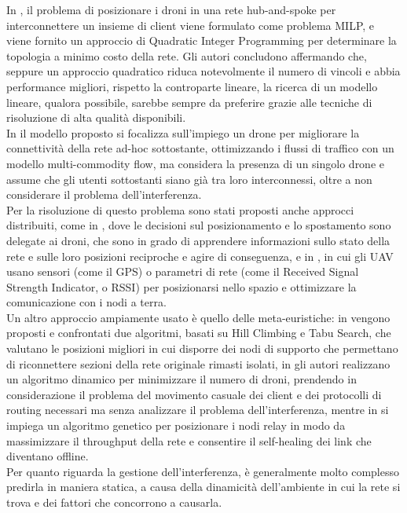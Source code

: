 In \cite{6564778}, il problema di posizionare i droni in una rete hub-and-spoke per interconnettere un insieme di client viene formulato come problema MILP, e viene fornito un approccio di Quadratic Integer Programming per determinare la topologia a minimo costo della rete.
Gli autori concludono affermando che, seppure un approccio quadratico riduca notevolmente il numero di vincoli e abbia performance migliori, rispetto la controparte lineare, la ricerca di un modello lineare, qualora possibile, sarebbe sempre da preferire grazie alle tecniche di risoluzione di alta qualità disponibili.\\
In \cite{4455114} il modello proposto si focalizza sull'impiego un drone per migliorare la connettività della rete ad-hoc sottostante, ottimizzando i flussi di traffico con un modello multi-commodity flow, ma considera la presenza di un singolo drone e assume che gli utenti sottostanti siano già tra loro interconnessi, oltre a non considerare il problema dell'interferenza. \\
Per la risoluzione di questo problema sono stati proposti anche approcci distribuiti, come in \cite{Correll09ad-hocwireless}, dove le decisioni sul posizionamento e lo spostamento sono delegate ai droni, che sono in grado di apprendere informazioni sullo stato della rete e sulle loro posizioni reciproche e agire di conseguenza, e in \cite{6162393}, in cui gli UAV usano sensori (come il GPS) o parametri di rete (come il Received Signal Strength Indicator, o RSSI) per posizionarsi nello spazio e ottimizzare la comunicazione con i nodi a terra. \\
Un altro approccio ampiamente usato è quello delle meta-euristiche: in \cite{5983050} vengono proposti e confrontati due algoritmi, basati su Hill Climbing e Tabu Search, che valutano le posizioni migliori in cui disporre dei nodi di supporto che permettano di riconnettere sezioni della rete originale rimasti isolati, in \cite{1495151} gli autori realizzano un algoritmo dinamico per minimizzare il numero di droni, prendendo in considerazione il problema del movimento casuale dei client e dei protocolli di routing necessari ma senza analizzare il problema dell'interferenza, mentre in \cite{Rohde20131893} si impiega un algoritmo genetico per posizionare i nodi relay in modo da massimizzare il throughput della rete e consentire il self-healing dei link che diventano offline. \\     
Per quanto riguarda la gestione dell'interferenza, è generalmente molto complesso predirla in maniera statica, a causa della dinamicità dell'ambiente in cui la rete si trova e dei fattori che concorrono a causarla.
